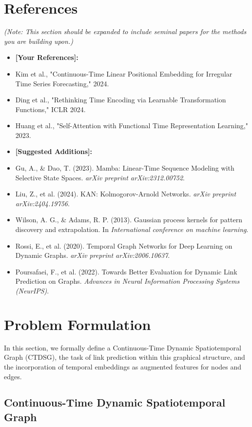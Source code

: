 \documentclass{article}
\begin{document}
\section*{References}
\textit{(Note: This section should be expanded to include seminal papers for the methods you are building upon.)}
\begin{itemize}
    \item \textbf{[Your References]:}
    \item Kim et al., "Continuous-Time Linear Positional Embedding for Irregular Time Series Forecasting," 2024.
    \item Ding et al., "Rethinking Time Encoding via Learnable Transformation Functions," ICLR 2024.
    \item Huang et al., "Self-Attention with Functional Time Representation Learning," 2023.
    \item \textbf{[Suggested Additions]:}
    \item Gu, A., \& Dao, T. (2023). Mamba: Linear-Time Sequence Modeling with Selective State Spaces. \textit{arXiv preprint arXiv:2312.00752}.
    \item Liu, Z., et al. (2024). KAN: Kolmogorov-Arnold Networks. \textit{arXiv preprint arXiv:2404.19756}.
    \item Wilson, A. G., \& Adams, R. P. (2013). Gaussian process kernels for pattern discovery and extrapolation. In \textit{International conference on machine learning}.
    \item Rossi, E., et al. (2020). Temporal Graph Networks for Deep Learning on Dynamic Graphs. \textit{arXiv preprint arXiv:2006.10637}.
    \item Poursafaei, F., et al. (2022). Towards Better Evaluation for Dynamic Link Prediction on Graphs. \textit{Advances in Neural Information Processing Systems (NeurIPS)}.
\end{itemize}
\printbibliography[title={References}]


\newpage

\section{Problem Formulation}

In this section, we formally define a Continuous-Time Dynamic Spatiotemporal Graph (CTDSG), the task of link prediction within this graphical structure, and the incorporation of temporal embeddings as augmented features for nodes and edges.

\subsection{Continuous-Time Dynamic Spatiotemporal Graph}
\end{document}
